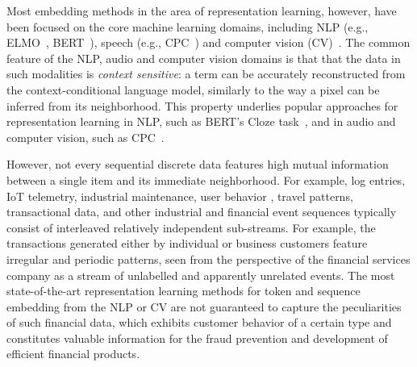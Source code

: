 \documentclass[sigconf, anonymous]{acmart}
\begin{document}
Most embedding methods in the area of representation learning, however, have been focused
on the core machine learning domains, including NLP (e.g., ELMO~\citep{Peters2018DeepCW}, BERT~\citep{Devlin2019BERTPO}), speech (e.g., CPC~\citep{Oord2018RepresentationLW}) and
computer vision (CV)~\citep{Doersch2015UnsupervisedVR, Oord2018RepresentationLW}.
%
The common feature of the NLP, audio and computer vision domains is that that the data in
such modalities is \emph{context sensitive}: a term can be accurately reconstructed from
the context-conditional language model, similarly to the way a pixel can be inferred from
its neighborhood. This property underlies popular approaches for representation learning
in NLP, such as BERT's Cloze task~\citep{Devlin2019BERTPO}, and in audio and computer
vision, such as CPC~\citep{Oord2018RepresentationLW}.

However, not every sequential discrete data features high mutual information between
a single item and its immediate neighborhood. For example, log entries, IoT telemetry,
industrial maintenance, user behavior \citep{Ni2018PerceiveYU}, travel patterns,
transactional data, and other industrial and financial event sequences typically
consist of interleaved relatively independent sub-streams.
%
For example, the transactions generated either by individual or business customers
feature irregular and periodic patterns, seen from the perspective of the financial
services company as a stream of unlabelled and apparently unrelated events. The most
state-of-the-art representation learning methods for token and sequence embedding
from the NLP or CV are not guaranteed to capture the peculiarities of such financial
data, which exhibits customer behavior of a certain type and constitutes valuable
information for the fraud prevention and development of efficient financial products.
\end{document}
